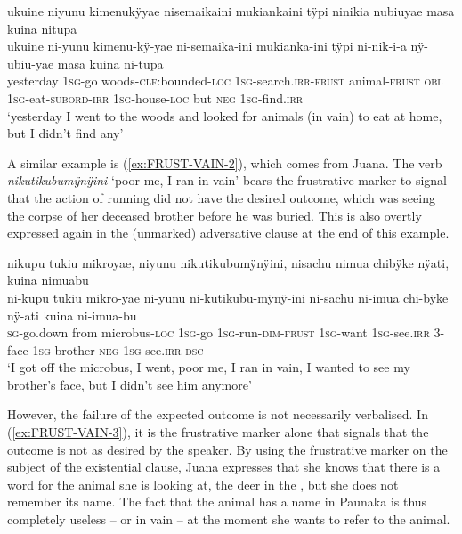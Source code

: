 \ea\label{ex:FRUST-VAIN-1}
\begingl 
\glpreamble ukuine niyunu kimenukÿyae nisemaikaini mukiankaini tÿpi ninikia nubiuyae masa kuina nitupa\\
\gla ukuine ni-yunu kimenu-kÿ-yae ni-semaika-ini mukianka-ini tÿpi ni-nik-i-a nÿ-ubiu-yae masa kuina ni-tupa\\ 
\glb yesterday 1\textsc{sg}-go woods-\textsc{clf}:bounded-\textsc{loc} 1\textsc{sg}-search.\textsc{irr}-\textsc{frust} animal-\textsc{frust} \textsc{obl} 1\textsc{sg}-eat-\textsc{subord}-\textsc{irr} 1\textsc{sg}-house-\textsc{loc} but \textsc{neg} 1\textsc{sg}-find.\textsc{irr}\\ 
\glft ‘yesterday I went to the woods and looked for animals (in vain) to eat at home, but I didn’t find any’
\trailingcitation{[nxx-a630101g-1.62]}
\xe

A similar example is (\ref{ex:FRUST-VAIN-2}), which comes from Juana. The verb \textit{nikutikubu\-mÿ\-nÿi\-ni} ‘poor me, I ran in vain’ bears the frustrative marker to signal that the action of running did not have the desired outcome, which was seeing the corpse of her deceased brother before he was buried. This is also overtly expressed again in the (unmarked) adversative clause at the end of this example.

\ea\label{ex:FRUST-VAIN-2}
\begingl 
\glpreamble nikupu tukiu mikroyae, niyunu nikutikubumÿnÿini, nisachu nimua chibÿke nÿati, kuina nimuabu\\
\gla ni-kupu tukiu mikro-yae ni-yunu ni-kutikubu-mÿnÿ-ini ni-sachu ni-imua chi-bÿke nÿ-ati kuina ni-imua-bu\\ 
\textsc{sg}-go.down from microbus-\textsc{loc} 1\textsc{sg}-go 1\textsc{sg}-run-\textsc{dim}-\textsc{frust} 1\textsc{sg}-want 1\textsc{sg}-see.\textsc{irr} 3-face 1\textsc{sg}-brother \textsc{neg} 1\textsc{sg}-see.\textsc{irr}-\textsc{dsc}\\ 
\glft ‘I got off the microbus, I went, poor me, I ran in vain, I wanted to see my brother's face, but I didn't see him anymore’
\trailingcitation{[jxx-p120430l-2.465]}
\xe

However, the failure of the expected outcome is not necessarily verbalised. In (\ref{ex:FRUST-VAIN-3}), it is the frustrative marker alone that signals that the outcome is not as desired by the speaker. By using the frustrative marker on the subject of the existential clause, Juana expresses that she knows that there is a word for the animal she is looking at, the deer in the , but she does not remember its name. The fact that the animal has a name in Paunaka is thus completely useless -- or in vain -- at the moment she wants to refer to the animal.

